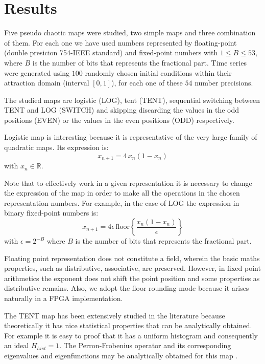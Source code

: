 \section{Results}\label{sec:resultados}

Five pseudo chaotic maps were studied, two simple maps and three combination of them.
For each one we have used numbers represented by floating-point (double presicion 754-IEEE standard) and  fixed-point numbers with $1\leq B \leq 53$, where $B$ is the number of bits that represents the fractional part.
Time series were generated using $100$ randomly chosen initial conditions within their attraction domain (interval $[0,1]$), for each one of these $54$ number precisions.

The studied maps are logistic (LOG), tent (TENT), sequential switching between TENT and LOG (SWITCH) and skipping discarding the values in the odd positions (EVEN) or the values in the even positions (ODD) respectively.

Logistic map is interesting because it is representative of the very large family of quadratic maps.
Its expression is:
%
\begin{equation}\label{eq:logimap}
x_{n+1}=4\,x_{n}(1-x_{n}) 
\end{equation}
%
with $x_n \in \mathbb{R}$.

Note that to effectively work in a given representation it is necessary to change the expression of the map in order to make all the operations in the chosen representation numbers. For example, in the case of LOG the expression in binary fixed-point numbers is:
%
\begin{equation}\label{eq:logimapB2}
x_{n+1}=4 \epsilon \,\text{floor}\left\{\frac{x_n(1-x_n)}{\epsilon}\right\}
\end{equation}
%
with $\epsilon = 2^{-B}$ where $B$ is the number of bits that represents the fractional part.

Floating point representation does not constitute a field, wherein the basic maths properties, such as distributive, associative, are preserved.
However, in fixed point arithmetics the exponent does not shift the point position and some properties as distributive remains.
Also, we adopt the floor rounding mode because it arises naturally in a FPGA implementation.

The TENT map has been extensively studied in the literature because theoretically it has nice statistical properties that can be analytically obtained.
For example it is easy to proof that it has a uniform histogram and consequently an ideal $H_{hist}=1$.
The Perron-Frobenius operator and its corresponding eigenvalues and eigenfunctions may be analytically obtained for this map \cite{Lasota1994}.

